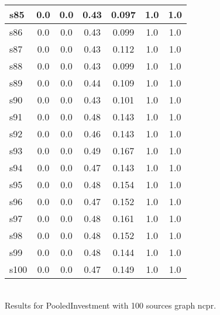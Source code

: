 \documentclass{article}
\begin{document}
\begin{tabular}{|l|c|c|c|c|c|c|}
\hline
s85 &0.0 & 0.0 & 0.43 & 0.097 & 1.0 & 1.0\\
\hline
s86 &0.0 & 0.0 & 0.43 & 0.099 & 1.0 & 1.0\\
\hline
s87 &0.0 & 0.0 & 0.43 & 0.112 & 1.0 & 1.0\\
\hline
s88 &0.0 & 0.0 & 0.43 & 0.099 & 1.0 & 1.0\\
\hline
s89 &0.0 & 0.0 & 0.44 & 0.109 & 1.0 & 1.0\\
\hline
s90 &0.0 & 0.0 & 0.43 & 0.101 & 1.0 & 1.0\\
\hline
s91 &0.0 & 0.0 & 0.48 & 0.143 & 1.0 & 1.0\\
\hline
s92 &0.0 & 0.0 & 0.46 & 0.143 & 1.0 & 1.0\\
\hline
s93 &0.0 & 0.0 & 0.49 & 0.167 & 1.0 & 1.0\\
\hline
s94 &0.0 & 0.0 & 0.47 & 0.143 & 1.0 & 1.0\\
\hline
s95 &0.0 & 0.0 & 0.48 & 0.154 & 1.0 & 1.0\\
\hline
s96 &0.0 & 0.0 & 0.47 & 0.152 & 1.0 & 1.0\\
\hline
s97 &0.0 & 0.0 & 0.48 & 0.161 & 1.0 & 1.0\\
\hline
s98 &0.0 & 0.0 & 0.48 & 0.152 & 1.0 & 1.0\\
\hline
s99 &0.0 & 0.0 & 0.48 & 0.144 & 1.0 & 1.0\\
\hline
s100 &0.0 & 0.0 & 0.47 & 0.149 & 1.0 & 1.0\\
\hline
\end{tabular}\\

\noindent Results for PooledInvestment with 100 sources graph ncpr.
\end{document}
